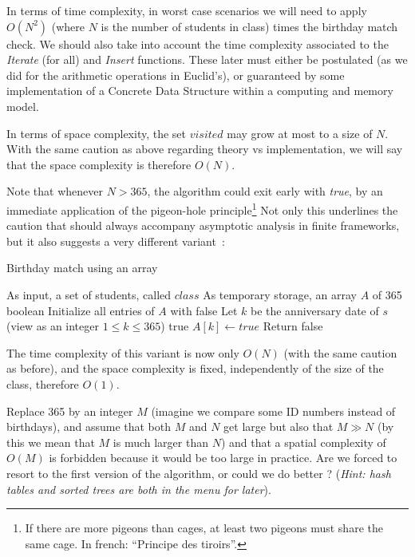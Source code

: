 \documentclass[12pt]{article}
\theoremstyle{plain}
\theoremstyle{remark}
\begin{document}
In terms of time complexity, in worst case scenarios we will need to apply
$O(N^2)$ (where $N$ is the number of students in class) times the birthday match
check. We should also take into account the time complexity associated to the
{\it Iterate} (for all) and {\it Insert} functions. These later must either be
postulated (as we did for the arithmetic operations in Euclid's), or guaranteed 
by some implementation of a Concrete Data Structure within a computing and
memory model.

\medskip

In terms of space complexity, the set $visited$ may grow at most to a size of
$N$. With the same caution as above regarding theory vs implementation, we will say that 
the space complexity is therefore $O(N)$.


Note that whenever $N > 365$, the algorithm could exit early with {\it true}, by
an immediate application of the pigeon-hole principle\footnote{If there are more pigeons than
cages, at least two pigeons must share the same cage. In french: ``Principe des
tiroirs''.} Not only this underlines
the caution that should always accompany asymptotic analysis in finite
frameworks, but it also suggests a very different variant~: 

\begin{algorithm}[H]
\caption{Birthday match using an array}
\begin{algorithmic}
\Require As input, a set of students, called $class$
\Require As temporary storage, an array $A$ of 365 boolean
\State Initialize all entries of $A$ with false
\State Let $k$ be the anniversary date of $s$ (view as an integer $1 \leq k \leq 365$)
\State \Return true
\Else
\State $A[k] \gets true$
\EndIf
\EndFor
\State Return false
\end{algorithmic}
\end{algorithm}

The time complexity of this variant is now only $O(N)$ (with the same caution as
before), and the space complexity is fixed, independently of the size of the
class, therefore $O(1)$.

\medskip

 Replace 365 by an integer $M$ (imagine we compare
some ID numbers instead of birthdays), and assume that both $M$ and $N$ get
large but also that $M \gg N$ (by this we mean that $M$ is much larger than $N$)
and that a spatial complexity of $O(M)$ is forbidden because it would be too
large in practice. Are we forced to resort to the first version of the
algorithm, or could we do better ? ({\it Hint: hash tables and sorted trees are both in the
menu for later}).
\end{document}
